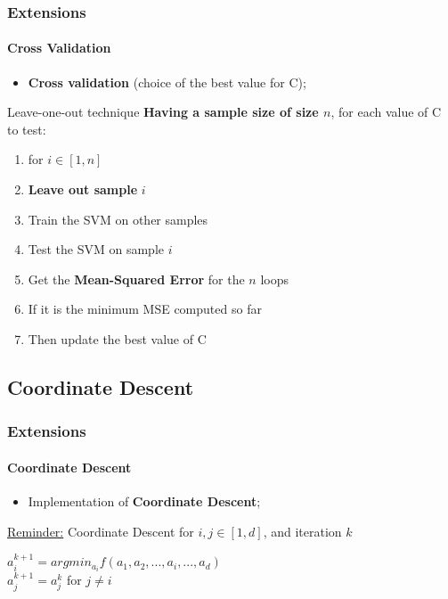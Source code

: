 \documentclass{beamer}
\begin{document}
\begin{frame}
\frametitle{Extensions}
\framesubtitle{Cross Validation}

\begin{itemize}
\item \textbf{Cross validation} (choice of the best value for C);
\end{itemize}

\bigskip
\pause

\begin{block}{Leave-one-out technique}
\textbf{Having a sample size of size $n$}, for each value of C to test:\\
\begin{enumerate}
\item for $i \in [1, n]$
\item \textbf{Leave out sample} $i$
\item Train the SVM on other samples 
\item Test the SVM on sample $i$
\item Get the \textbf{Mean-Squared Error} for the $n$ loops
\item If it is the minimum MSE computed so far
\item Then update the best value of C
\end{enumerate}
\end{block}

\end{frame}

\subsection{Coordinate Descent}

\begin{frame}
\tableofcontents[currentsubsection]
\end{frame}

\begin{frame}
\frametitle{Extensions}
\framesubtitle{Coordinate Descent}

\begin{itemize}

\item Implementation of \textbf{Coordinate Descent};

\bigskip
\pause

\end{itemize}

\begin{block}{\underline{Reminder:} Coordinate Descent}
for $i, j \in [1, d]$, and iteration $k$\\
\begin{center}
$a_i^{k+1} = argmin_{a_i} f(a_1, a_2, ..., a_i, ..., a_d)$\\
$a_j^{k+1} = a_j^{k}$ for $j \neq i$
\end{center}
\end{block}

\end{frame}
\end{document}
